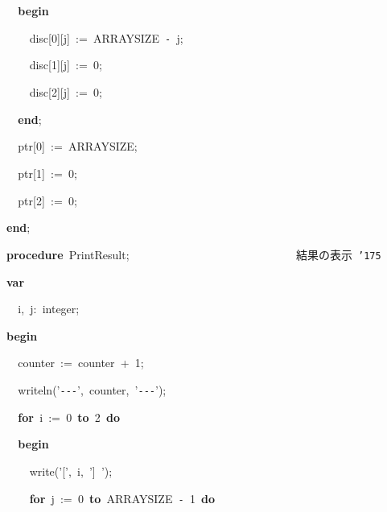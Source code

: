 \documentclass{article}
\begin{document}
\noindent
\mbox{}{\tt\mc \ \ }{\textbf{b}}{\textbf{e}}{\textbf{g}}{\textbf{i}}{\textbf{n}}

\noindent
\mbox{}{\tt\mc \ \ \ \ }disc[0][j]{\tt\mc \ }:={\tt\mc \ }ARRAYSIZE{\tt\mc \ }{\tt -}{\tt\mc \ }j;

\noindent
\mbox{}{\tt\mc \ \ \ \ }disc[1][j]{\tt\mc \ }:={\tt\mc \ }0;

\noindent
\mbox{}{\tt\mc \ \ \ \ }disc[2][j]{\tt\mc \ }:={\tt\mc \ }0;

\noindent
\mbox{}{\tt\mc \ \ }{\textbf{e}}{\textbf{n}}{\textbf{d}};

\noindent
\mbox{}{\tt\mc \ \ }ptr[0]{\tt\mc \ }:={\tt\mc \ }ARRAYSIZE;

\noindent
\mbox{}{\tt\mc \ \ }ptr[1]{\tt\mc \ }:={\tt\mc \ }0;

\noindent
\mbox{}{\tt\mc \ \ }ptr[2]{\tt\mc \ }:={\tt\mc \ }0;

\noindent
\mbox{}{\textbf{e}}{\textbf{n}}{\textbf{d}};

\noindent
\mbox{}\hfill

\noindent
\mbox{}{\textbf{p}}{\textbf{r}}{\textbf{o}}{\textbf{c}}{\textbf{e}}{\textbf{d}}{\textbf{u}}{\textbf{r}}{\textbf{e}}{\tt\mc \ }PrintResult;{\tt\mc \ \ \ \ \ \ \ \ \ \ \ \ \ \ \ \ \ \ \ \ \ \ \ \ \ \ \ \ }\rm{}\ 結果の表示\ {\tt\char'175}
\tt\mc 

\noindent
\mbox{}{\textbf{v}}{\textbf{a}}{\textbf{r}}

\noindent
\mbox{}{\tt\mc \ \ }i,{\tt\mc \ }j:{\tt\mc \ }integer;

\noindent
\mbox{}{\textbf{b}}{\textbf{e}}{\textbf{g}}{\textbf{i}}{\textbf{n}}

\noindent
\mbox{}{\tt\mc \ \ }counter{\tt\mc \ }:={\tt\mc \ }counter{\tt\mc \ }+{\tt\mc \ }1;

\noindent
\mbox{}{\tt\mc \ \ }writeln('{\tt -}{\tt -}{\tt -}',{\tt\mc \ }counter,{\tt\mc \ }'{\tt -}{\tt -}{\tt -}');

\noindent
\mbox{}{\tt\mc \ \ }{\textbf{f}}{\textbf{o}}{\textbf{r}}{\tt\mc \ }i{\tt\mc \ }:={\tt\mc \ }0{\tt\mc \ }{\textbf{t}}{\textbf{o}}{\tt\mc \ }2{\tt\mc \ }{\textbf{d}}{\textbf{o}}

\noindent
\mbox{}{\tt\mc \ \ }{\textbf{b}}{\textbf{e}}{\textbf{g}}{\textbf{i}}{\textbf{n}}

\noindent
\mbox{}{\tt\mc \ \ \ \ }write('[',{\tt\mc \ }i,{\tt\mc \ }']{\tt\mc \ }');

\noindent
\mbox{}{\tt\mc \ \ \ \ }{\textbf{f}}{\textbf{o}}{\textbf{r}}{\tt\mc \ }j{\tt\mc \ }:={\tt\mc \ }0{\tt\mc \ }{\textbf{t}}{\textbf{o}}{\tt\mc \ }ARRAYSIZE{\tt\mc \ }{\tt -}{\tt\mc \ }1{\tt\mc \ }{\textbf{d}}{\textbf{o}}
\end{document}
